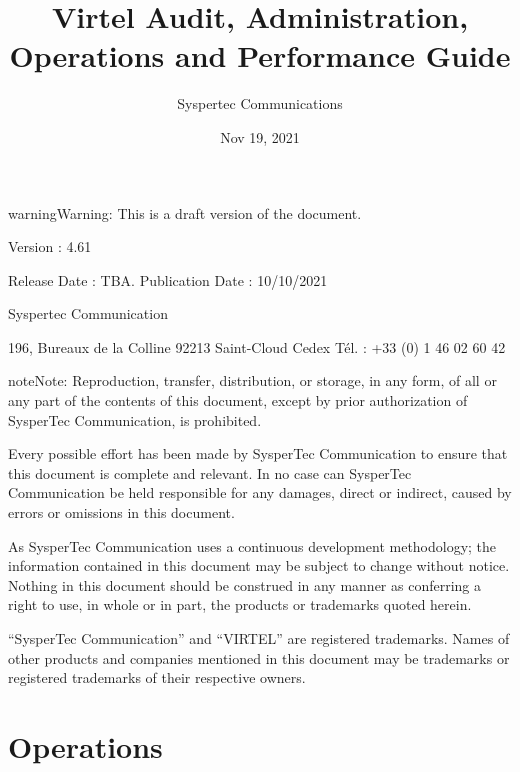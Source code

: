 \documentclass[letterpaper,10pt,english]{sphinxmanual}
\title{Virtel Audit, Administration, Operations and Performance Guide}
\date{Nov 19, 2021}
\author{Syspertec Communications}
\begin{document}
\pagestyle{empty}
\sphinxmaketitle
\pagestyle{plain}
\sphinxtableofcontents
\pagestyle{normal}
\label{\detokenize{audit_operations_ and_performance::doc}}




\begin{sphinxadmonition}{warning}{Warning:}
This is a draft version of the document.
\end{sphinxadmonition}

Version : 4.61

Release Date : TBA. Publication Date : 10/10/2021

Syspertec Communication

196, Bureaux de la Colline 92213 Saint-Cloud Cedex Tél. : +33 (0) 1 46 02 60 42


\begin{sphinxadmonition}{note}{Note:}
Reproduction, transfer, distribution, or storage, in any form, of all or any part of
the contents of this document, except by prior authorization of SysperTec
Communication, is prohibited.

Every possible effort has been made by SysperTec Communication to ensure that this document
is complete and relevant. In no case can SysperTec Communication be held responsible for
any damages, direct or indirect, caused by errors or omissions in this document.

As SysperTec Communication uses a continuous development methodology; the information
contained in this document may be subject to change without notice. Nothing in this
document should be construed in any manner as conferring a right to use, in whole or in
part, the products or trademarks quoted herein.

“SysperTec Communication” and “VIRTEL” are registered trademarks. Names of other products
and companies mentioned in this document may be trademarks or registered trademarks of
their respective owners.
\end{sphinxadmonition}


\chapter{Operations}
\label{\detokenize{audit_operations_ and_performance:operations}}\label{\detokenize{audit_operations_ and_performance:v461ap-introduction}}
\ignorespaces 
\end{document}
